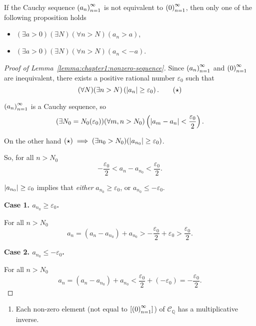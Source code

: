 \begin{lemma}\label{lemma:chapter1:nonzero-sequence}
    If the Cauchy sequence ${\left({a_{n}}\right)}^{\infty}_{n=1}$ is not equivalent to ${\left({0}\right)}^{\infty}_{n=1}$, then only one of the following proposition holds
    \begin{itemize}[itemsep=0pt]
        \item $(\exists a > 0)(\exists N)(\forall n > N)(a_{n} > a)$,
        \item $(\exists a > 0)(\exists N)(\forall n > N)(a_{n} < -a)$.
    \end{itemize}
\end{lemma}

\begin{proof}[Proof of Lemma~\ref{lemma:chapter1:nonzero-sequence}]
    Since ${\left({a_{n}}\right)}^{\infty}_{n=1}$ and ${\left({0}\right)}^{\infty}_{n=1}$ are inequivalent, there exists a positive rational number $\varepsilon_{0}$ such that
    \begin{equation*}
        (\forall N)(\exists n > N)\left(\left\vert{a_{n}}\right\vert\ge\varepsilon_{0}\right).\tag{$\star$}
    \end{equation*}

    ${\left({a_{n}}\right)}^{\infty}_{n=1}$ is a Cauchy sequence, so
    \[
        (\exists N_{0}=N_{0}(\varepsilon_{0}))(\forall m, n > N_{0})\left(\left\vert{a_{m} - a_{n}}\right\vert < \frac{\varepsilon_{0}}{2}\right).
    \]

    On the other hand $(\star)\implies (\exists n_{0} > N_{0})(\left\vert{a_{n_{0}}}\right\vert\ge\varepsilon_{0})$.

    So, for all $n > N_{0}$
    \[
        -\frac{\varepsilon_{0}}{2} < a_{n} - a_{n_{0}} < \frac{\varepsilon_{0}}{2}.
    \]

    $\left\vert{a_{n_{0}}}\right\vert\ge\varepsilon_{0}$ implies that \textit{either} $a_{n_{0}}\ge\varepsilon_{0}$, or $a_{n_{0}}\le-\varepsilon_{0}$.
    \bigskip

    \textbf{Case 1. $a_{n_{0}}\ge\varepsilon_{0}$.}

    For all $n > N_{0}$
    \[
        a_{n} = (a_{n} - a_{n_{0}}) + a_{n_{0}} > -\frac{\varepsilon_{0}}{2} + \varepsilon_{0} > \frac{\varepsilon_{0}}{2}.
    \]

    \textbf{Case 2. $a_{n_{0}}\le-\varepsilon_{0}$.}

    For all $n > N_{0}$
    \[
        a_{n} = (a_{n} - a_{n_{0}}) + a_{n_{0}} < \frac{\varepsilon_{0}}{2} + (-\varepsilon_{0}) = -\frac{\varepsilon_{0}}{2}.
    \]
\end{proof}

\begin{theorem}
    \begin{enumerate}[label={(F\arabic*)},start=9]
        \item Each non-zero element (not equal to $\left[{{\left({0}\right)}^{\infty}_{n=1}}\right]$) of $\mathscr{C}_{\mathbb{Q}}$ has a multiplicative inverse.
    \end{enumerate}
\end{theorem}

